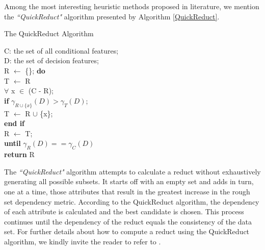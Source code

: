 \documentclass{llncs}
\begin{document}
Among the most interesting heuristic methods proposed in literature, we mention the \emph{``QuickReduct"} algorithm \cite{shen2007rough} presented by Algorithm \ref{QuickReduct}.

\begin{algorithm}[!ht]
\caption{The QuickReduct Algorithm} \label{QuickReduct}
\begin{algorithmic}[1]
\STATE C: the set of all conditional features;\\
\STATE D: the set of decision features;\\
\STATE R $\leftarrow$ \{\};
\STATE \textbf{do} \\
\STATE \hspace{0.24cm} T $\leftarrow$ R\\
 \STATE \hspace{0.24cm} $\forall$ x $\in$ (C - R);\\
 \STATE \hspace{0.28cm} \textbf{if} $\gamma_{R \cup \{x\}}(D) > \gamma_T(D)$;\\
  \STATE \hspace{0.35cm} T $\leftarrow$ R $\cup$ \{x\};\\
  \STATE \hspace{0.28cm} \textbf{end if} \\
  \STATE \hspace{0.24cm} R $\leftarrow$ T;\\
  \STATE \textbf{until} $\gamma_R(D) == \gamma_C(D)$\\
  \STATE \textbf{return} R
\end{algorithmic}
\end{algorithm}

The \emph{``QuickReduct"} algorithm  attempts to calculate a reduct without exhaustively generating all possible subsets. It starts off with an empty set and adds in turn, one at a time, those attributes that result in the greatest increase in the rough set dependency metric. According to the QuickReduct algorithm, the dependency of each attribute is calculated and the best candidate is chosen. This process continues until the dependency of the reduct equals the consistency of the data set.
For further details about how to compute a  reduct using the   QuickReduct algorithm, we kindly invite the reader to refer to  \cite{shen2007rough}.


%
\end{document}
